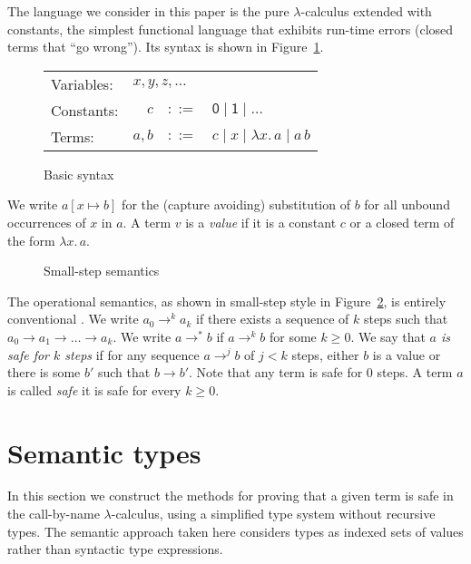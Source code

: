 \documentclass[10pt,a4paper,final,twocolumn]{article}
\theoremstyle{definition}
\theoremstyle{plain}
\newcommand{\abstr}[2]{\ensuremath{\lambda{#1}.\,{#2}}}
\newcommand{\app}[2]{\ensuremath{{#1}\,{#2}}}
\begin{document}
The language we consider in this paper is the pure $\lambda$-calculus extended with constants,
the simplest functional language that exhibits run-time errors (closed terms that ``go wrong'').
Its syntax is shown in Figure~\ref{fig:Basic_syntax}.
\begin{figure}[htb]
  \centering
  \begin{tabular}{lrcl}
    Variables: & \multicolumn{3}{l}{$x,y,z,\ldots$} \\
    Constants: & $c$ & $::=$ & $\mathsf{0} \mid \mathsf{1} \mid \ldots$ \\
    Terms: & $a,b$ & $::=$ & $c \mid x \mid \abstr{x}{a} \mid \app{a}{b}$
  \end{tabular}
  \caption{Basic syntax}
  \label{fig:Basic_syntax}
\end{figure}
We write $a[x \mapsto b]$ for the (capture avoiding) substitution of $b$ for all unbound occurrences
of $x$ in $a$. A term $v$ is a \emph{value} if it is a constant $c$ or a closed term of the form
$\abstr{x}{a}$.
\begin{figure}[htb]
  \centering
  \caption{Small-step semantics}
  \label{fig:Small_step_semantics}
\end{figure}

The operational semantics, as shown in small-step style in Figure~\ref{fig:Small_step_semantics},
is entirely conventional \cite{Pierce02}. We write \mbox{$a_0 \to^k a_k$} if there exists a sequence of $k$ 
steps such that \mbox{$a_0 \to a_1 \to \ldots \to a_k$}. We write \mbox{$a \to^* b$} if \mbox{$a \to^k b$}
for some \mbox{$k \ge 0$}. We say that \emph{$a$ is safe for $k$ steps} if for any sequence \mbox{$a \to^j b$}
of \mbox{$j < k$} steps, either $b$ is a value or there is some $b'$ such that \mbox{$b \to b'$}. Note that
any term is safe for $0$ steps. A term $a$ is called \emph{safe} it is safe for every \mbox{$k \ge 0$}.


\section{Semantic types}
\label{sec:Semantic_types}


In this section we construct the methods for proving that a given term is safe in the call-by-name
$\lambda$-calculus, using a simplified type system without recursive types. The semantic approach
taken here considers types as indexed sets of values rather than syntactic type expressions.
\end{document}
